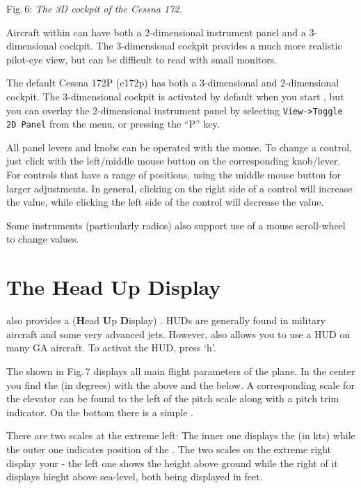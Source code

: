 \smallskip
 \noindent
Fig.\,6: \textit{The 3D cockpit of the Cessna 172.}
\medskip

Aircraft within \FlightGear{} can have both a 2-dimensional instrument panel
and a 3-dimensional cockpit. The 3-dimensional cockpit provides a much
more realistic pilot-eye view, but can be difficult to read with small
monitors.

The default Cessna 172P (c172p) has both a 3-dimensional and 2-dimensional
cockpit. The 3-dimensional cockpit is activated by default when you start
\FlightGear{}, but you can overlay the 2-dimensional instrument panel by
selecting \texttt{View->Toggle 2D Panel} from the menu, or pressing the ``P'' key.

All panel levers and knobs can be operated with the mouse. To change a
control, just click with the left/middle mouse button on the
corresponding knob/lever. For controls that have a range of positions,
using the middle mouse button for larger adjustments. In general, clicking
on the right side of a control will increase the value, while clicking the left side
of the control will decrease the value.

Some instruments (particularly radios) also support use of a mouse scroll-wheel
to change values.

\section{The Head Up Display}

\FlightGear{} also provides a  (\textbf{H}ead \textbf{U}p
\textbf{D}isplay) . HUDs are generally found in military
aircraft and some very advanced jets. However, \FlightGear{} also allows you
to use a HUD on many GA aircraft. To activat the HUD, press `h'.

The  shown in Fig.\,7  displays all main flight parameters of the
plane. In the center you find the  (in degrees) with the
 above and the  below. A
corresponding scale for the elevator can be found
to the left of the pitch scale along with a pitch trim indicator. On the bottom
there is a simple .

There are two scales at the extreme left: The inner one displays the 
 (in kts) while the outer one indicates position of the .
The two scales on the extreme right display your  - the left one
shows the height above ground while the right of it displays hieght above sea-level,
both being displayed in feet.

